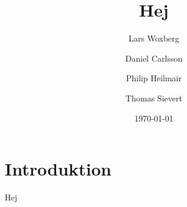 \documentclass{article}
\author{Lars Woxberg \and Daniel Carlsson \and Philip Heilmair \and Thomas Sievert}
\date{\today}
\title{Hej}
\begin{document}
\maketitle

\section{Introduktion}
Hej
\end{document}
